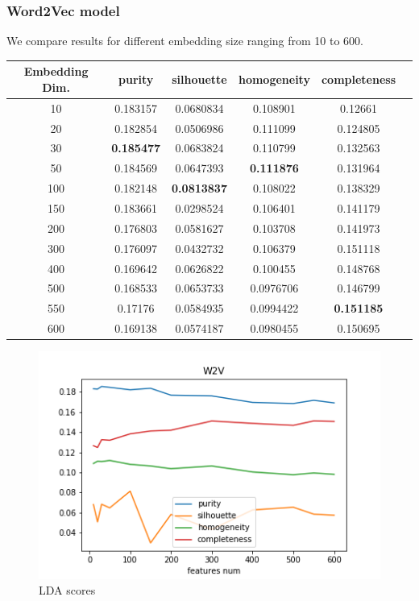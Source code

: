\documentclass[11pt]{article}
\begin{document}
\subsubsection{Word2Vec model}

We compare results for different embedding size ranging from 10 to 600.

\begin{center}
\begin{tabular}{ |c|c|c|c|c|c| }
\hline
Embedding Dim.  & purity  & silhouette  & homogeneity  & completeness\\ \hline 
10  & 0.183157  & 0.0680834  & 0.108901  & 0.12661\\ \hline 
20  & 0.182854  & 0.0506986  & 0.111099  & 0.124805\\ \hline 
30  & \textbf{0.185477}  & 0.0683824  & 0.110799  & 0.132563\\ \hline 
50  & 0.184569  & 0.0647393  & \textbf{0.111876}  & 0.131964\\ \hline 
100  & 0.182148  & \textbf{0.0813837}  & 0.108022  & 0.138329\\ \hline 
150  & 0.183661  & 0.0298524  & 0.106401  & 0.141179\\ \hline 
200  & 0.176803  & 0.0581627  & 0.103708  & 0.141973\\ \hline 
300  & 0.176097  & 0.0432732  & 0.106379  & 0.151118\\ \hline 
400  & 0.169642  & 0.0626822  & 0.100455  & 0.148768\\ \hline 
500  & 0.168533  & 0.0653733  & 0.0976706  & 0.146799\\ \hline 
550  & 0.17176  & 0.0584935  & 0.0994422  & \textbf{0.151185}\\ \hline 
600  & 0.169138  & 0.0574187  & 0.0980455  & 0.150695\\ \hline \end{tabular}
\end{center}
\FloatBarrier

\begin{figure}[h]
\centering
 	\includegraphics[scale=0.7]{w2v_scores.png}
	\caption{LDA scores}
\label{w2v_scores}
\end{figure}
\FloatBarrier
\end{document}
